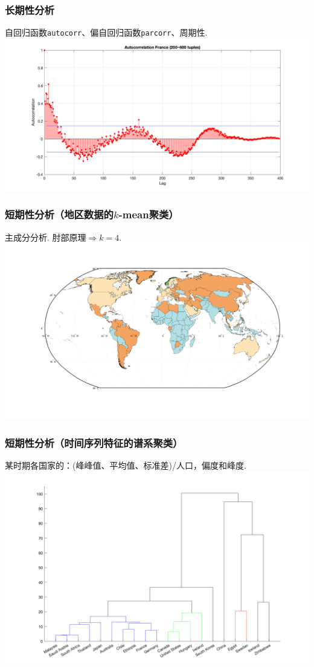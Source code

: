 \documentclass{beamer}
\begin{document}
\begin{frame}
\frametitle{长期性分析}
    自回归函数\texttt{autocorr}、偏自回归函数\texttt{parcorr}、周期性.
    \includegraphics[width=\textwidth]{./images/France_ACF.png}
\end{frame}
\begin{frame}
\frametitle{短期性分析（地区数据的$k$-mean聚类）}
    主成分分析. 肘部原理$\Rightarrow k=4$.
    \includegraphics[width=\textwidth]{./images/World_Classification.png}
\end{frame}
\begin{frame}
\frametitle{短期性分析（时间序列特征的谱系聚类）}
    某时期各国家的：(峰峰值、平均值、标准差)/人口，偏度和峰度.
    \includegraphics[width=\textwidth]{./images/Tree_2.png}
\end{frame}
\end{document}
